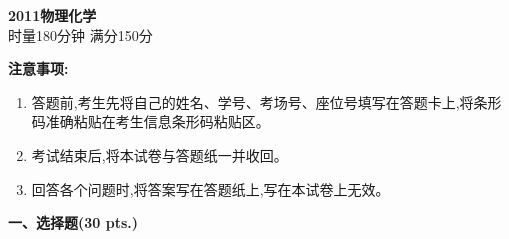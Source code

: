 \begin{center}
    {\LARGE \textbf{2011物理化学}} \\[2ex]
    {\large 时量180分钟 \quad 满分150分}
\end{center}

\vspace{0.5cm}
\noindent\textbf{注意事项:}
\begin{enumerate}[label=\arabic*., parsep=0pt, itemsep=0pt]
    \item 答题前,考生先将自己的姓名、学号、考场号、座位号填写在答题卡上,将条形码准确粘贴在考生信息条形码粘贴区。
    \item 考试结束后,将本试卷与答题纸一并收回。
    \item 回答各个问题时,将答案写在答题纸上,写在本试卷上无效。
\end{enumerate}

\vspace{0.5cm}
\noindent\textbf{一、选择题(30 pts.)}

